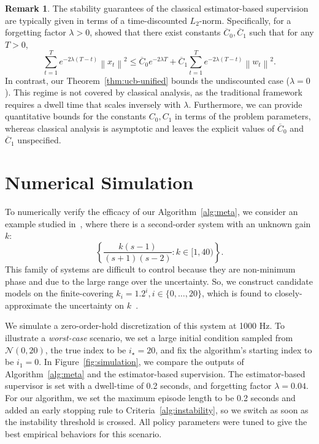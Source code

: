 \documentclass[11pt, twoside]{article}
\theoremstyle{definition}
\newtheorem{remark}{Remark}
\newcommand{\norm}[1]{\left\lVert #1 \right\rVert}
\begin{document}
\begin{remark}
    The stability guarantees of the classical estimator-based supervision are typically given in terms of a time-discounted $L_2$-norm.
    Specifically, for a forgetting factor $\lambda > 0$, \citet{hespanha2001tutorial} showed that there exist constants $\overline{C}_0, \overline{C}_1$ such that for any $T > 0$,
    \[\sum_{t=1}^T e^{-2\lambda (T-t)}\norm{x_t}^2 \le \overline{C}_0 e^{-2\lambda T} + \overline{C}_1 \sum_{t=1}^T e^{-2\lambda (T-t)} \norm{w_t}^2.\]
    In contrast, our Theorem~\ref{thm:ucb-unified} bounds the undiscounted case ($\lambda = 0$).
    This regime is not covered by classical analysis, as the traditional framework requires a dwell time that scales inversely with $\lambda$.
    Furthermore, we can provide quantitative bounds for the constants $C_0, C_1$ in terms of the problem parameters, whereas classical analysis is asymptotic and leaves the explicit values of $\overline{C}_0$ and $\overline{C}_1$ unspecified.
\end{remark}

 
\section{Numerical Simulation}
To numerically verify the efficacy of our Algorithm~\ref{alg:meta}, we consider an example studied in~\cite{anderson2000multiple}, where there is a second-order system with an unknown gain $k$:
\[ \left\{\frac{k(s-1)}{(s+1)(s-2)} : k \in [1, 40)\right\}.\]
This family of systems are difficult to control because they are non-minimum phase and due to the large range over the uncertainty.
So, we construct candidate models on the finite-covering $k_i = 1.2^i, i \in \{0, \dots, 20\}$, which is found to closely-approximate the uncertainty on $k$~\cite{anderson2000multiple}.

We simulate a zero-order-hold discretization of this system at 1000 Hz.
To illustrate a \textit{worst-case} scenario, we set a large initial condition sampled from $\mathcal{N}(0, 20)$, the true index to be $i_\star = 20$, and fix the algorithm's starting index to be $i_1 = 0$.
In Figure~\ref{fig:simulation}, we compare the outputs of Algorithm~\ref{alg:meta} and the estimator-based supervision.
The estimator-based supervisor is set with a dwell-time of 0.2 seconds, and forgetting factor $\lambda = 0.04$.
For our algorithm, we set the maximum episode length to be 0.2 seconds and added an early stopping rule to Criteria~\ref{alg:instability}, so we switch as soon as the instability threshold is crossed.
All policy parameters were tuned to give the best empirical behaviors for this scenario.
\end{document}
